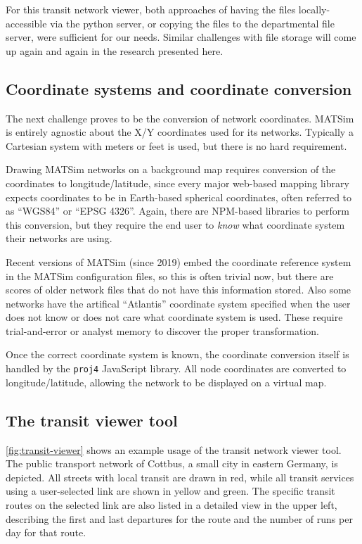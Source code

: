 For this transit network viewer, both approaches of having the files locally-accessible via the python server, or copying the files to the departmental file server, were sufficient for our needs. Similar challenges with file storage will come up again and again in the research presented here.

\hypertarget{server-experiments-coords}{%
\subsection{Coordinate systems and coordinate conversion}
\label{server-experiments-coords}}

The next challenge proves to be the conversion of network coordinates. MATSim is entirely agnostic about the X/Y coordinates used for its networks. Typically a Cartesian system with meters or feet is used, but there is no hard requirement.

Drawing MATSim networks on a background map requires conversion of the coordinates to longitude/latitude, since every major web-based mapping library expects coordinates to be in Earth-based spherical coordinates, often referred to as ``WGS84'' or ``EPSG 4326''. Again, there are NPM-based libraries to perform this conversion, but they require the end user to \emph{know} what coordinate system their networks are using.

Recent versions of MATSim (since 2019) embed the coordinate reference system in the MATSim configuration files, so this is often trivial now, but there are scores of older network files that do not have this information stored. Also some networks have the artifical ``Atlantis'' coordinate system specified when the user does not know or does not care what coordinate system is used. These require trial-and-error or analyst memory to discover the proper transformation.

Once the correct coordinate system is known, the coordinate conversion itself is handled by the \texttt{proj4} JavaScript library. All node coordinates are converted to longitude/latitude, allowing the network to be displayed on a virtual map.

\hypertarget{server-experiments-transit-result}{%
\subsection{The transit viewer tool}
\label{server-experiments-tool-transit}}

\autoref{fig:transit-viewer} shows an example usage of the transit network viewer tool. The public transport network of Cottbus, a small city in eastern Germany, is depicted. All streets with local transit are drawn in red, while all transit services using a user-selected link are shown in yellow and green. The specific transit routes on the selected link are also listed in a detailed view in the upper left, describing the first and last departures for the route and the number of runs per day for that route.


